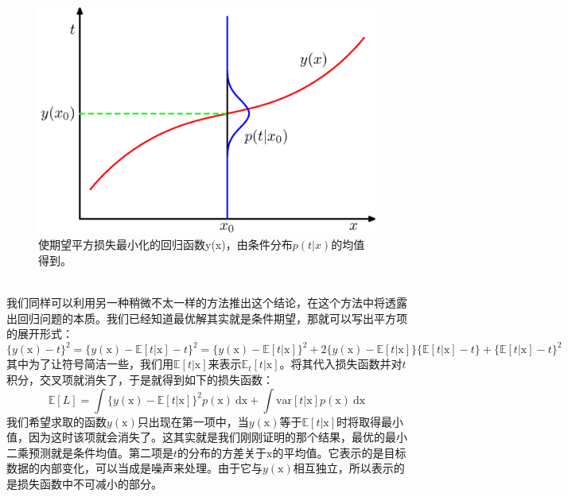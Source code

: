 \documentclass[b5paper]{book}
\numberwithin{equation}{chapter}
\newcommand {\bx} {\boldsymbol{\mathrm{x}}}
\begin{document}
{\begin{figure}[ht]
		\includegraphics[scale=0.8]{Images/1-28.png}
		\caption{使期望平方损失最小化的回归函数y(x)，由条件分布$p(t|x)$的均值得到。}
		\label{fig:1-28}
	\end{figure}
	\\
	\indent 我们同样可以利用另一种稍微不太一样的方法推出这个结论，在这个方法中将透露出回归问题的本质。我们已经知道最优解其实就是条件期望，那就可以写出平方项的展开形式：
	\[ \{y(\boldsymbol{\mathrm{x}})-t\}^2 = \{y(\boldsymbol{\mathrm{x}})-\mathbb{E}[t|\boldsymbol{\mathrm{x}}]-t\}^2 = \{y(\boldsymbol{\mathrm{x}})-\mathbb{E}[t|\boldsymbol{\mathrm{x}}]\}^2 + 2\{y(\boldsymbol{\mathrm{x}})-\mathbb{E}[t|\boldsymbol{\mathrm{x}}]\}\{\mathbb{E}[t|\boldsymbol{\mathrm{x}}]-t\}+\{\mathbb{E}[t|\boldsymbol{\mathrm{x}}]-t\}^2 \] 
	其中为了让符号简洁一些，我们用$\mathbb{E}[t|\boldsymbol{\mathrm{x}}]$来表示$\mathbb{E}_t[t|\boldsymbol{\mathrm{x}}]$。将其代入损失函数并对$t$积分，交叉项就消失了，于是就得到如下的损失函数：
	\begin{equation}
		\mathbb{E}[L]=\int \{y(\boldsymbol{\mathrm{x}})-\mathbb{E}[t|\boldsymbol{\mathrm{x}}]\}^2p(\boldsymbol{\mathrm{x}})\ \mathrm{d}\boldsymbol{\mathrm{x}} + \int \mathrm{var}[t|\bx]p(\boldsymbol{\mathrm{x}})\ \mathrm{d}\boldsymbol{\mathrm{x}}
	\end{equation}
	我们希望求取的函数$y(\boldsymbol{\mathrm{x}})$只出现在第一项中，当$y(\boldsymbol{\mathrm{x}})$等于$\mathbb{E}[t|\boldsymbol{\mathrm{x}}]$时将取得最小值，因为这时该项就会消失了。这其实就是我们刚刚证明的那个结果，最优的最小二乘预测就是条件均值。第二项是$t$的分布的方差关于$\boldsymbol{\mathrm{x}}$的平均值。它表示的是目标数据的内部变化，可以当成是噪声来处理。由于它与$y(\boldsymbol{\mathrm{x}})$相互独立，所以表示的是损失函数中不可减小的部分。\\
}
\end{document}
